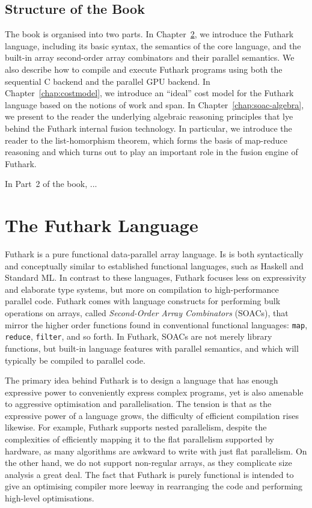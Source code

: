 \documentclass[11pt]{book}
\begin{document}
\section{Structure of the Book}

The book is organised into two parts. In Chapter~\ref{chap:futlang}, we
introduce the Futhark language, including its basic syntax, the
semantics of the core language, and the built-in array second-order
array combinators and their parallel semantics. We also describe how
to compile and execute Futhark programs using both the sequential C
backend and the parallel GPU backend. In Chapter~\ref{chap:costmodel}, we introduce
an ``ideal'' cost model for the Futhark language based on the notions
of work and span. In Chapter~\ref{chap:soac-algebra}, we present to
the reader the underlying algebraic reasoning principles that lye
behind the Futhark internal fusion technology. In particular, we
introduce the reader to the list-homorphism theorem, which forms the
basis of map-reduce reasoning and which turns out to play an important
role in the fusion engine of Futhark.

In Part~2 of the book, ...

\chapter{The Futhark Language}
\label{chap:futlang}
Futhark is a pure functional data-parallel array language.  Is is both
syntactically and conceptually similar to established functional
languages, such as Haskell and Standard ML.  In contrast to these
languages, Futhark focuses less on expressivity and elaborate type
systems, but more on compilation to high-performance parallel code.
Futhark comes with language constructs for performing bulk operations
on arrays, called \textit{Second-Order Array Combinators} (SOACs),
that mirror the higher order functions found in conventional
functional languages: \texttt{map}, \texttt{reduce}, \texttt{filter},
and so forth.  In Futhark, SOACs are not merely library functions, but
built-in language features with parallel semantics, and which will
typically be compiled to parallel code.

The primary idea behind Futhark is to design a language that has
enough expressive power to conveniently express complex programs, yet
is also amenable to aggressive optimisation and parallelisation.  The
tension is that as the expressive power of a language grows, the
difficulty of efficient compilation rises likewise.  For example,
Futhark supports nested parallelism, despite the complexities of
efficiently mapping it to the flat parallelism supported by hardware,
as many algorithms are awkward to write with just flat parallelism.
On the other hand, we do not support non-regular arrays, as they
complicate size analysis a great deal.  The fact that Futhark is
purely functional is intended to give an optimising compiler more
leeway in rearranging the code and performing high-level
optimisations.
\end{document}
